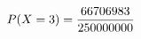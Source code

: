 \documentclass[preview]{standalone}
\begin{document}
\begin{align*}
\special{dvisvgm:raw <g id='unique000'>}P(X=3)=\frac{66706983}{250000000}\special{dvisvgm:raw </g>}
\end{align*}
\end{document}
